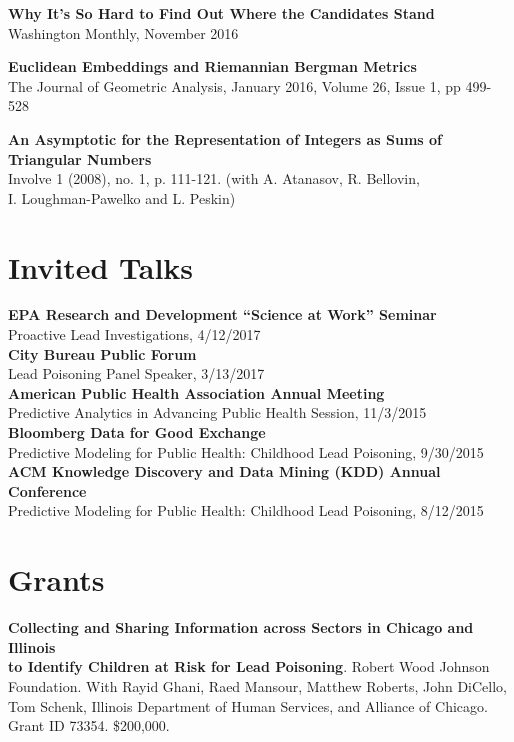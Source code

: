 \documentclass[margin,line]{resume}
\begin{document}
\begin{resume}
        {\bf Why It’s So Hard to Find Out Where the Candidates Stand} \\
        Washington Monthly, November 2016

	{\bf Euclidean Embeddings and Riemannian Bergman Metrics} \\
	The Journal of Geometric Analysis, January 2016, Volume 26, Issue 1, pp 499-528

        \newpage
	{\bf An Asymptotic for the Representation of Integers as Sums of\\Triangular Numbers} \\
	Involve 1 (2008), no. 1, p. 111-121. (with A. Atanasov, R. Bellovin,\\ I. Loughman-Pawelko and L. Peskin)

	\section{\mysidestyle Invited Talks}
	{\bf EPA Research and Development ``Science at Work'' Seminar} \\
        Proactive Lead Investigations, 4/12/2017 \\
	{\bf City Bureau Public Forum} \\
        Lead Poisoning Panel Speaker, 3/13/2017 \\
	{\bf American Public Health Association Annual Meeting} \\
    Predictive Analytics in Advancing Public Health Session, 11/3/2015 \\
	{\bf Bloomberg Data for Good Exchange} \\
    Predictive Modeling for Public Health: Childhood Lead Poisoning, 9/30/2015 \\
    {\bf ACM Knowledge Discovery and Data Mining (KDD) Annual Conference} \\
        Predictive Modeling for Public Health: Childhood Lead Poisoning, 8/12/2015\\

	\section{\mysidestyle Grants}
        {\bf Collecting and Sharing Information across Sectors in Chicago and Illinois\\ to Identify Children at Risk for Lead Poisoning}. Robert Wood Johnson\\ Foundation. With Rayid Ghani, Raed Mansour, Matthew Roberts, John DiCello,\\ Tom Schenk,  Illinois Department of Human Services, and Alliance of Chicago.\\ Grant ID 73354. \$200,000. \\


\end{resume}
\end{document}
